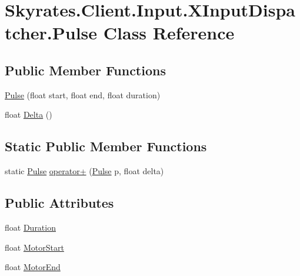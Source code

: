 \hypertarget{class_skyrates_1_1_client_1_1_input_1_1_x_input_dispatcher_1_1_pulse}{\section{Skyrates.\-Client.\-Input.\-X\-Input\-Dispatcher.\-Pulse Class Reference}
\label{class_skyrates_1_1_client_1_1_input_1_1_x_input_dispatcher_1_1_pulse}
}


 


\subsection*{Public Member Functions}
\begin{DoxyCompactItemize}
\item 
\hyperlink{class_skyrates_1_1_client_1_1_input_1_1_x_input_dispatcher_1_1_pulse_abf14fbb7ce803f1dd780a0671734487f}{Pulse} (float start, float end, float duration)
\item 
float \hyperlink{class_skyrates_1_1_client_1_1_input_1_1_x_input_dispatcher_1_1_pulse_ae679dbddb9756d6b224c1ec0ba0d591a}{Delta} ()
\end{DoxyCompactItemize}
\subsection*{Static Public Member Functions}
\begin{DoxyCompactItemize}
\item 
static \hyperlink{class_skyrates_1_1_client_1_1_input_1_1_x_input_dispatcher_1_1_pulse}{Pulse} \hyperlink{class_skyrates_1_1_client_1_1_input_1_1_x_input_dispatcher_1_1_pulse_a68f37330b43dfda088b3d9ecf386cd4d}{operator+} (\hyperlink{class_skyrates_1_1_client_1_1_input_1_1_x_input_dispatcher_1_1_pulse}{Pulse} p, float delta)
\end{DoxyCompactItemize}
\subsection*{Public Attributes}
\begin{DoxyCompactItemize}
\item 
float \hyperlink{class_skyrates_1_1_client_1_1_input_1_1_x_input_dispatcher_1_1_pulse_a47ce72df82bf2a4f4474d45e238d04c9}{Duration}
\item 
float \hyperlink{class_skyrates_1_1_client_1_1_input_1_1_x_input_dispatcher_1_1_pulse_a5f9b43b20bf6a10c7433e3f995504704}{Motor\-Start}
\item 
float \hyperlink{class_skyrates_1_1_client_1_1_input_1_1_x_input_dispatcher_1_1_pulse_a636425c095036c9cf34e77404b905d37}{Motor\-End}
\end{DoxyCompactItemize}


